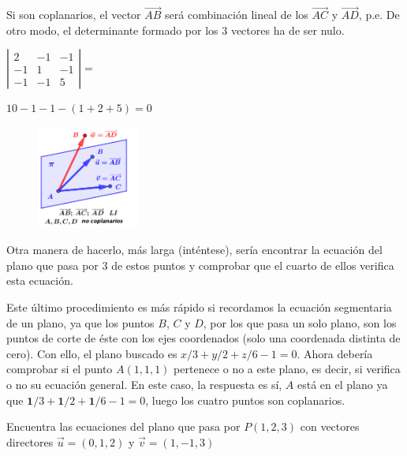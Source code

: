 \begin{proofw}\renewcommand{\qedsymbol}{$\diamond$}

\vspace{-2mm} 
Si son coplanarios, el vector $\overrightarrow{AB}$ será combinación lineal de los  $\overrightarrow{AC}$ y  $\overrightarrow{AD}$, p.e. De otro modo, el determinante formado por los 3 vectores ha de ser nulo.
\vspace{-2mm} 
\begin{multicols}{2}
\noindent \small{$\left| \begin{matrix} 2&-1&-1\\-1&1&-1\\-1&-1&5 \end{matrix} \right|=$} 

\noindent \small{$10-1-1-(1+2+5)=0$} 
 \begin{figure}[H]
		\centering
		\includegraphics[width=0.3\textwidth]{imagenes/imagenes10/T10IM00X.png}
 \end{figure}
\end{multicols}


\normalsize{Otra} manera de hacerlo, más larga (inténtese), sería encontrar la ecuación del plano que pasa por 3 de estos puntos y comprobar que el cuarto de ellos verifica esta ecuación.

Este último procedimiento es más rápido si recordamos la ecuación segmentaria de un plano, ya que los puntos $B$, $C$ y $D$, por los que pasa un solo plano, son los puntos de corte de éste con los ejes coordenados (solo una coordenada distinta de cero). Con ello, el plano buscado es $x/3+y/2+z/6-1=0$. Ahora debería comprobar si el punto $A(1,1,1)$ pertenece o no a este plano, es decir, si verifica o no su ecuación general. En este caso, la respuesta es sí, $A$ está en el plano ya que $\boldsymbol{1}/3+\boldsymbol{1}/2+\boldsymbol{1}/6-1=0$, luego los cuatro puntos son coplanarios.

\end{proofw}

\begin{ejre}
Encuentra las ecuaciones del plano que pasa por $P(1,2,3)$ con vectores directores $\vec u=(0,1,2)$ y $\vec v=(1,-1,3)$	
\end{ejre}

